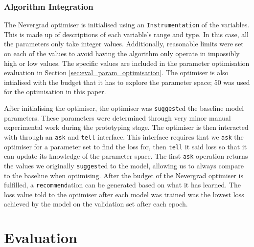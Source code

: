 \documentclass{l4proj}
\begin{document}
\subsection{Algorithm Integration}

The Nevergrad optimiser is initialised using an \lstinline{Instrumentation} of the variables. This is made up of descriptions of each variable’s range and type. In this case, all the parameters only take integer values. Additionally, reasonable limits were set on each of the values to avoid having the algorithm only operate in impossibly high or low values. The specific values are included in the parameter optimisation evaluation in Section \ref{sec:eval_param_optimisation}. The optimiser is also intialised with the budget that it has to explore the parameter space; $50$ was used for the optimisation in this paper.

After initialising the optimiser, the optimiser was \lstinline{suggest}ed the baseline model parameters. These parameters were determined through very minor manual experimental work during the prototyping stage. The optimiser is then interacted with through an \lstinline{ask} and \lstinline{tell} interface. This interface requires that we \lstinline{ask} the optimiser for a parameter set to find the loss for, then \lstinline{tell} it said loss so that it can update its knowledge of the parameter space. The first \lstinline{ask} operation returns the values we originally \lstinline{suggest}ed to the model, allowing us to always compare to the baseline when optimising. After the budget of the Nevergrad optimiser is fulfilled, a \lstinline{recommend}ation can be generated based on what it has learned. The loss value told to the optimiser after each model was trained was the lowest loss achieved by the model on the validation set after each epoch.

\chapter{Evaluation} \label{chap:evaluation}


\end{document}
